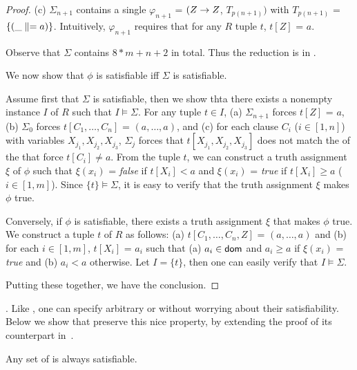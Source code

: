 \begin{proof}
\item[(c)] $\Sigma_{n + 1}$ contains a single \pCFD $\varphi_{n+1}$ =
$(Z \rightarrow Z$, $T_{p(n+1)})$ with $T_{p(n+1)}$ = $\{(\_ \parallel = a)\}$.
Intuitively, $\varphi_{n+1}$ requires that for any $R$ tuple $t$,
$t[Z]$ = $a$. 
\ei

Observe that $\Sigma$ contains $8*m + n + 2$ \pCFDs in total. Thus the
reduction is in \PTIME. 

We now show that $\phi$ is satisfiable iff $\Sigma$ is satisfiable.

Assume first that $\Sigma$ is satisfiable, then we  show thta there exists a nonempty
instance $I$ of $R$ such that $I\models\Sigma$. For any tuple $t\in
I$, (a) $\Sigma_{n+1}$ forces $t[Z]$ = $a$, (b) $\Sigma_0$ forces
$t[C_1, \ldots, C_n]$ = $(a, \ldots, a)$, and (c) for each clause $C_i$
($i\in[1, n]$) with variables $X_{j_1},X_{j_2},X_{j_3}$, $\Sigma_j$
forces that $t[X_{j_1},X_{j_2},X_{j_3}]$  does not match the \LHS of
the \pCFDs that force $t[C_i]\ne a$. From the tuple $t$, we can construct a
truth assignment $\xi$ of $\phi$ such that $\xi(x_i)$ = {\em false}
if $t[X_i]< a$ and  $\xi(x_i)$ = {\em true} if $t[X_i]\ge a$
($i\in[1, m]$). Since $\{t\}\models\Sigma$, it is easy to verify
that the truth assignment $\xi$ makes $\phi$ true.

Conversely, if $\phi$ is satisfiable, there exists a truth
assignment $\xi$ that makes $\phi$ true. We construct a tuple $t$ of
$R$ as follows: (a) $t[C_1,\ldots, C_n, Z]$ = $(a, \ldots, a)$ and
(b) for each $i\in[1, m]$, $t[X_i]$ = $a_i$ such that (a) $a_i\in\protect\mathsf{dom}$ and
$a_i\ge a$ if $\xi(x_i)$ = {\em true} and (b) $a_i< a$ otherwise. Let $I
= \{t\}$, then one can easily verify that $I\models\Sigma$. 


Putting these together, we have the conclusion.
\end{proof}



. Like \FDs,
one can specify arbitrary \INDs or \CINDs without worrying about
their satisfiability. Below we show that \pCINDs preserve this nice
property, by extending the proof of its counterpart in~\cite{tcs-CINDs}.

\begin{prop}
\label{thm-sat-pcind} Any set of \pCINDs is always
satisfiable. 
\end{prop}

